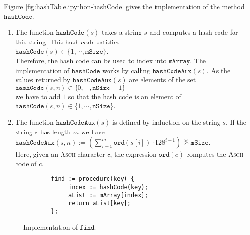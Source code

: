 Figure \ref{fig:hashTable.ipython-hashCode} gives the implementation of the method $\texttt{hashCode}$.
\begin{enumerate}
\item The function $\texttt{hashCode}(s)$ takes a string $s$ and computes a hash code for this string.
      This hash code satisfies
      \\[0.2cm]
      \hspace*{1.3cm}
      $\texttt{hashCode}(s) \in \{ 1, \cdots, \texttt{mSize} \}$.
      \\[0.2cm]
      Therefore, the hash code can be used to index into $\texttt{mArray}$.  The implementation of
      $\texttt{hashCode}$ works by calling $\texttt{hashCodeAux}(s)$.  As the values returned by
      $\texttt{hashCodeAux}(s)$ are elements of the set
      \\[0.2cm]
      \hspace*{1.3cm}
      $\texttt{hashCode}(s,n) \in \{ 0, \cdots, \texttt{mSize}-1 \}$      
      \\[0.2cm]
      we have to add $1$ so that the hash code is an element of 
      \\[0.2cm]
      \hspace*{1.3cm}
      $\texttt{hashCode}(s,n) \in \{ 1, \cdots, \texttt{mSize} \}$.      
\item The function $\texttt{hashCodeAux}(s)$ is defined by induction on the string $s$.
      If the string $s$ has length $m$ we have
      \\[0.2cm]
      \hspace*{1.3cm}
      $\texttt{hashCodeAux}(s,n) := \left(\sum\limits_{i=1}^m \texttt{ord}(s[i]) \cdot 128^{i-1}\right) \;\texttt{\%}\; \texttt{mSize}$.
      \\[0.2cm]
      Here, given an \textsc{Ascii} character $c$, the expression  $\texttt{ord}(c)$ computes the
      \textsc{Ascii} code of  $c$.
\end{enumerate}

\begin{figure}[!ht]
\centering
\begin{verbatim}
        find := procedure(key) {
             index := hashCode(key);
             aList := mArray[index];
             return aList[key];
        };
\end{verbatim}
\vspace*{-0.3cm}
\caption{Implementation of $\texttt{find}$.}
\label{fig:hashTable.ipython-find}
\end{figure}

